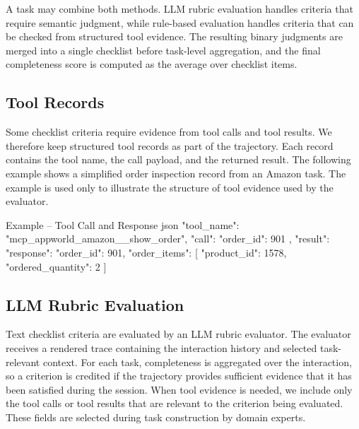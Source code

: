 \documentclass{llmxive}
\providecommand{\tcolorboxPromptExampleToolCallTitleText}{\fontsize{10}{12}\selectfont}
\providecommand{\tcolorboxPromptExampleToolCallCommonText}{\fontsize{7.5}{9}\selectfont}
\providecommand{\tcolorboxPromptExampleToolCallTitleBeforeVspace}{\vspace{10 pt}}
\providecommand{\tcolorboxPromptExampleToolCallCommonTextLineSkip}{\setlength{\baselineskip}{5 pt}}
\begin{document}
A task may combine both methods. LLM rubric evaluation handles criteria that require semantic judgment, while rule-based evaluation handles criteria that can be checked from structured tool evidence. The resulting binary judgments are merged into a single checklist before task-level aggregation, and the final completeness score is computed as the average over checklist items.

\subsection{Tool Records}
\label{app:eval_tool_records}

Some checklist criteria require evidence from tool calls and tool results. We therefore keep structured tool records as part of the trajectory. Each record contains the tool name, the call payload, and the returned result. The following example shows a simplified order inspection record from an Amazon task. The example is used only to illustrate the structure of tool evidence used by the evaluator.


\renewcommand{\tcolorboxPromptExampleToolCallTitleText}{}
\renewcommand{\tcolorboxPromptExampleToolCallCommonText}{}
\renewcommand{\tcolorboxPromptExampleToolCallTitleBeforeVspace}{}
\renewcommand{\tcolorboxPromptExampleToolCallCommonTextLineSkip}{}

\begin{tcbCodeListing}{Example -- Tool Call and Response
}{json}
{
  "tool_name": "mcp_appworld_amazon__show_order",
  "call": {
    "order_id": 901
  },
  "result": {
    "response": {
      "order_id": 901,
      "order_items": [
        {
          "product_id": 1578,
          "ordered_quantity": 2
        }
      ]
    }
  }
}
\end{tcbCodeListing}

\subsection{LLM Rubric Evaluation}
\label{app:eval_rubric_tool_context}

Text checklist criteria are evaluated by an LLM rubric evaluator. The evaluator receives a rendered trace containing the interaction history and selected task-relevant context.
For each task, completeness is aggregated over the interaction, so a criterion is credited if the trajectory provides sufficient evidence that it has been satisfied during the session.
When tool evidence is needed, we include only the tool calls or tool results that are relevant to the criterion being evaluated. These fields are selected during task construction by domain experts.
\end{document}
